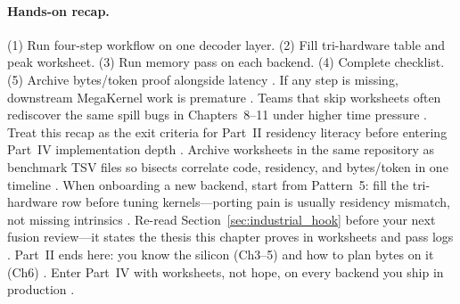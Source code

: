 \paragraph{Hands-on recap.}
(1) Run four-step workflow on one decoder layer. (2) Fill tri-hardware table and peak worksheet. (3) Run memory pass on each backend. (4) Complete checklist. (5) Archive bytes/token proof alongside latency \citep{taxbreak2026,memoryfloor2026,yirage2026,patel2025llminference,dao2022flashattention,amd2024xdna,nvidia2022hopper,semianalysis2024tma,dlbook,wu2024mirage,rotem2018glow,mpk2025,kwon2023vllm,dao2023flashdecoding,liu2024deepseekv3}.
If any step is missing, downstream MegaKernel work is premature \citep{chen2020compilerbasedhardw}.
Teams that skip worksheets often rediscover the same spill bugs in Chapters~8--11 under higher time pressure \citep{taxbreak2026,memoryfloor2026,semianalysis2024tma}.
Treat this recap as the exit criteria for Part~II residency literacy before entering Part~IV implementation depth \citep{patel2025llminference,yirage2026,mpk2025}.
Archive worksheets in the same repository as benchmark TSV files so bisects correlate code, residency, and bytes/token in one timeline \citep{taxbreak2026,memoryfloor2026,chen2020compilerbasedhardw}.
When onboarding a new backend, start from Pattern~5: fill the tri-hardware row before tuning kernels---porting pain is usually residency mismatch, not missing intrinsics \citep{yirage2026,amd2024xdna,nvidia2022hopper,patel2025llminference}.
Re-read Section~\ref{sec:industrial_hook} before your next fusion review---it states the thesis this chapter proves in worksheets and pass logs \citep{taxbreak2026,memoryfloor2026,dao2022flashattention}.
Part~II ends here: you know the silicon (Ch3--5) and how to plan bytes on it (Ch6) \citep{chen2020compilerbasedhardw,yirage2026,patel2025llminference}.
Enter Part~IV with worksheets, not hope, on every backend you ship in production \citep{memoryfloor2026,taxbreak2026,patel2025llminference}.

